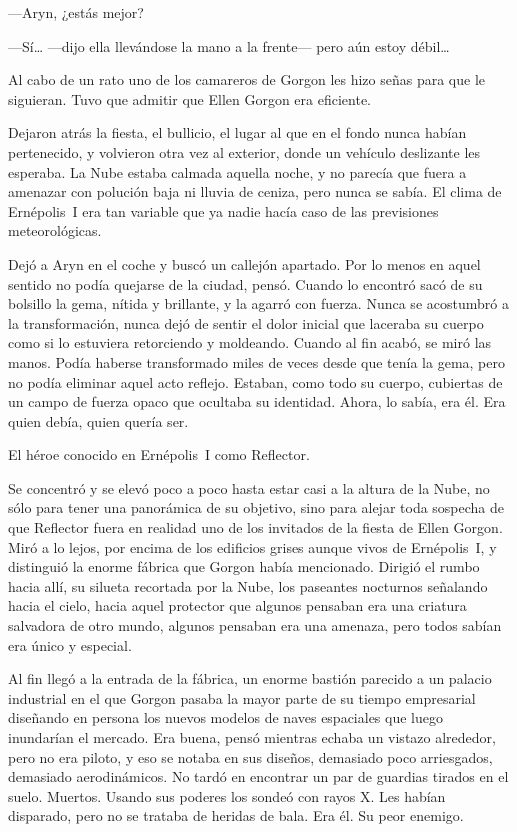---Aryn, ¿estás mejor?

---Sí\dots{} ---dijo ella llevándose la mano a la frente--- pero aún estoy débil\dots

Al cabo de un rato uno de los camareros de Gorgon les hizo señas para que le siguieran. Tuvo que admitir que Ellen Gorgon era eficiente.

Dejaron atrás la fiesta, el bullicio, el lugar al que en el fondo nunca habían pertenecido, y volvieron otra vez al exterior, donde un vehículo deslizante les esperaba. La Nube estaba calmada aquella noche, y no parecía que fuera a amenazar con polución baja ni lluvia de ceniza, pero nunca se sabía. El clima de Ernépolis~I era tan variable que ya nadie hacía caso de las previsiones meteorológicas.

Dejó a Aryn en el coche y buscó un callejón apartado. Por lo menos en aquel sentido no podía quejarse de la ciudad, pensó. Cuando lo encontró sacó de su bolsillo la gema, nítida y brillante, y la agarró con fuerza. Nunca se acostumbró a la transformación, nunca dejó de sentir el dolor inicial que laceraba su cuerpo como si lo estuviera retorciendo y moldeando. Cuando al fin acabó, se miró las manos. Podía haberse transformado miles de veces desde que tenía la gema, pero no podía eliminar aquel acto reflejo. Estaban, como todo su cuerpo, cubiertas de un campo de fuerza opaco que ocultaba su identidad. Ahora, lo sabía, era él. Era quien debía, quien quería ser.

El héroe conocido en Ernépolis~I como Reflector.

Se concentró y se elevó poco a poco hasta estar casi a la altura de la Nube, no sólo para tener una panorámica de su objetivo, sino para alejar toda sospecha de que Reflector fuera en realidad uno de los invitados de la fiesta de Ellen Gorgon. Miró a lo lejos, por encima de los edificios grises aunque vivos de Ernépolis~I, y distinguió la enorme fábrica que Gorgon había mencionado. Dirigió el rumbo hacia allí, su silueta recortada por la Nube, los paseantes nocturnos señalando hacia el cielo, hacia aquel protector que algunos pensaban era una criatura salvadora de otro mundo, algunos pensaban era una amenaza, pero todos sabían era único y especial.

Al fin llegó a la entrada de la fábrica, un enorme bastión parecido a un palacio industrial en el que Gorgon pasaba la mayor parte de su tiempo empresarial diseñando en persona los nuevos modelos de naves espaciales que luego inundarían el mercado. Era buena, pensó mientras echaba un vistazo alrededor, pero no era piloto, y eso se notaba en sus diseños, demasiado poco arriesgados, demasiado aerodinámicos. No tardó en encontrar un par de guardias tirados en el suelo. Muertos. Usando sus poderes los sondeó con rayos X. Les habían disparado, pero no se trataba de heridas de bala. Era él. Su peor enemigo.

